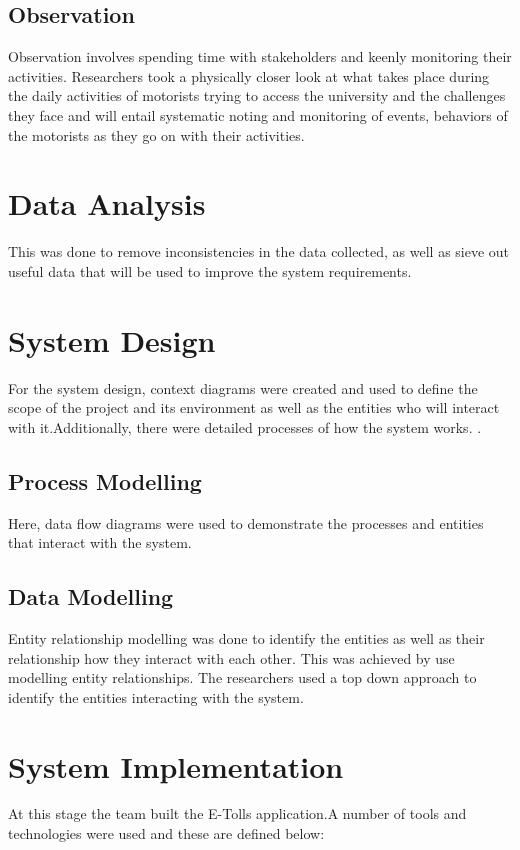 \subsection{Observation}
Observation involves spending time with stakeholders and keenly monitoring their activities. Researchers took a physically closer look at what takes place during the daily activities of motorists trying to access the university and the challenges they face and will entail systematic noting and monitoring of events, behaviors of the motorists as they go on with their activities.


\section{Data Analysis}
This was done to remove inconsistencies in the data collected, as well as sieve out useful data that will be used to improve the system requirements.


\section{System Design}
For the system design, context diagrams were created and used to define the scope of the project and its environment as well as the entities who will interact with it.Additionally, there were detailed processes of how the system works. \cite{rumbaugh_object-oriented_1991}.

\subsection{Process Modelling}
Here, data flow diagrams were used to demonstrate the processes and entities that interact with the system.

\subsection{Data Modelling}
Entity relationship modelling was done to identify the entities as well as their relationship how they interact with each other.
This was achieved by use modelling entity relationships. The researchers used a top down approach to identify the entities interacting with the system.


\section{System Implementation}
At this stage the team built the E-Tolls application.A number of tools and technologies were used and these are defined below:

